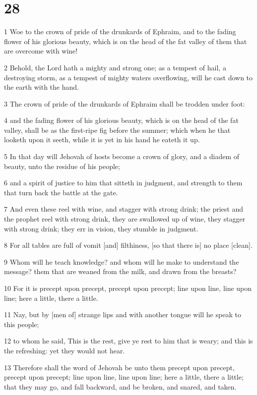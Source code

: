 \chapter{28}

\par 1 Woe to the crown of pride of the drunkards of Ephraim, and to the fading flower of his glorious beauty, which is on the head of the fat valley of them that are overcome with wine!
\par 2 Behold, the Lord hath a mighty and strong one; as a tempest of hail, a destroying storm, as a tempest of mighty waters overflowing, will he cast down to the earth with the hand.
\par 3 The crown of pride of the drunkards of Ephraim shall be trodden under foot:
\par 4 and the fading flower of his glorious beauty, which is on the head of the fat valley, shall be as the first-ripe fig before the summer; which when he that looketh upon it seeth, while it is yet in his hand he eateth it up.
\par 5 In that day will Jehovah of hosts become a crown of glory, and a diadem of beauty, unto the residue of his people;
\par 6 and a spirit of justice to him that sitteth in judgment, and strength to them that turn back the battle at the gate.
\par 7 And even these reel with wine, and stagger with strong drink; the priest and the prophet reel with strong drink, they are swallowed up of wine, they stagger with strong drink; they err in vision, they stumble in judgment.
\par 8 For all tables are full of vomit [and] filthiness, [so that there is] no place [clean].
\par 9 Whom will he teach knowledge? and whom will he make to understand the message? them that are weaned from the milk, and drawn from the breasts?
\par 10 For it is precept upon precept, precept upon precept; line upon line, line upon line; here a little, there a little.
\par 11 Nay, but by [men of] strange lips and with another tongue will he speak to this people;
\par 12 to whom he said, This is the rest, give ye rest to him that is weary; and this is the refreshing: yet they would not hear.
\par 13 Therefore shall the word of Jehovah be unto them precept upon precept, precept upon precept; line upon line, line upon line; here a little, there a little; that they may go, and fall backward, and be broken, and snared, and taken.
